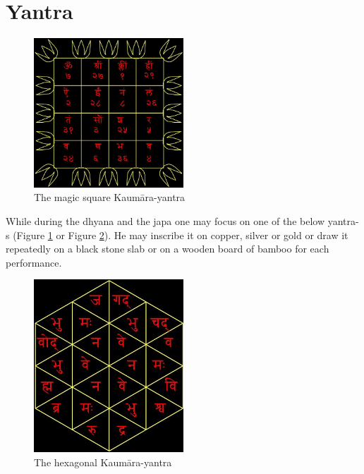 \documentclass[13pt]{article}
\begin{document}
\section{Yantra}
\begin{figure}[h]
  \centering
    \includegraphics[width=0.5\textwidth]{kaumara_magic_square}
    \caption{The magic square Kaumāra-yantra}
    \label{fig:fig1}
    \end{figure}
    
While during the dhyana and the japa one may focus on one of the below yantra-s (Figure \ref{fig:fig1} or Figure \ref{fig:fig2}). He may inscribe it on copper, silver or gold or draw it repeatedly on a black stone slab or on a wooden board of bamboo for each performance.

\begin{figure}[h]
  \centering
    \includegraphics[width=0.5\textwidth]{shaktyuta_mUrti_yantra}
    \caption{The hexagonal Kaumāra-yantra}
    \label{fig:fig2}
    \end{figure}
\end{document}
